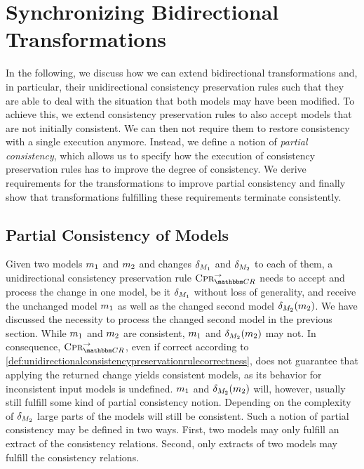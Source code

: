 \section{Synchronizing Bidirectional Transformations}
\label{chap:synchronizing:bidirectional}

In the following, we discuss how we can extend bidirectional transformations and, in particular, their unidirectional consistency preservation rules such that they are able to deal with the situation that both models may have been modified.
To achieve this, we extend consistency preservation rules to also accept models that are not initially consistent.
We can then not require them to restore consistency with a single execution anymore.
Instead, we define a notion of \emph{partial consistency}, which allows us to specify how the execution of consistency preservation rules has to improve the degree of consistency.
We derive requirements for the transformations to improve partial consistency and finally show that transformations fulfilling these requirements terminate consistently.


\subsection{Partial Consistency of Models}
\label{chap:synchronizing:bidirectional:partial}

Given two models $\model{m}{1}$ and $\model{m}{2}$ and changes $\change{\metamodel{M}{1}}$ and $\change{\metamodel{M}{2}}$ to each of them, a unidirectional consistency preservation rule $\consistencypreservationrule{\consistencyrelationset{CR}}^{\rightarrow}$ needs to accept and process the change in one model, be it $\change{\metamodel{M}{1}}$ without loss of generality, and receive the unchanged model $\model{m}{1}$ as well as the changed second model $\change{\metamodel{M}{2}}(\model{m}{2})$.
We have discussed the necessity to process the changed second model in the previous section.
While $\model{m}{1}$ and $\model{m}{2}$ are consistent, $\model{m}{1}$ and $\change{\metamodel{M}{2}}(\model{m}{2})$ may not.
In consequence, $\consistencypreservationrule{\consistencyrelationset{CR}}^{\rightarrow}$, even if correct according to \autoref{def:unidirectionalconsistencypreservationrulecorrectness}, does not guarantee that applying the returned change yields consistent models, as its behavior for inconsistent input models is undefined.
$\model{m}{1}$ and $\change{\metamodel{M}{2}}(\model{m}{2})$ will, however, usually still fulfill some kind of partial consistency notion.
Depending on the complexity of $\change{\metamodel{M}{2}}$ large parts of the models will still be consistent.
Such a notion of partial consistency may be defined in two ways.
First, two models may only fulfill an extract of the consistency relations.
Second, only extracts of two models may fulfill the consistency relations.

